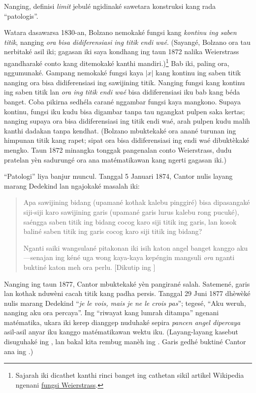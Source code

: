 \documentclass[../../../include/open-logic-section]{subfiles}
\begin{document}

Nanging, definisi \emph{limit} jebulé ngidinaké
sawetara konstruksi kang rada ``patologis''.

Watara dasawarsa 1830-an, Bolzano nemokaké
fungsi kang \emph{kontinu ing saben titik},
nanging \emph{ora bisa didiferensiasi ing titik endi waé}.
(Sayangé, Bolzano ora tau nerbitaké asil iki;
gagasan iki saya kondhang ing taun
1872 nalika Weierstrass ngandharaké
conto kang ditemokaké kanthi mandiri.)\footnote{Sajarah
iki dicathet kanthi rinci banget ing cathetan
sikil artikel Wikipedia ngenani
\href{http://en.wikipedia.org/wiki/Weierstrass_function}{fungsi
Weierstrass}.} Bab iki, paling ora, nggumunaké.
Gampang nemokaké fungsi kaya $|x|$ kang
kontinu ing saben titik nanging ora bisa
didiferensiasi ing sawijining titik.
Nanging fungsi kang kontinu ing saben
titik lan \emph{ora ing titik endi waé}
bisa didiferensiasi iku bab kang béda
banget. Coba pikirna sedhéla carané
nggambar fungsi kaya mangkono. Supaya
kontinu, fungsi iku kudu bisa digambar
tanpa tau ngangkat pulpen saka kertas;
nanging supaya ora bisa didiferensiasi
ing titik endi waé, arah pulpen kudu
malih kanthi dadakan tanpa kendhat.
(Bolzano mbuktekaké ora anané turunan ing himpunan titik kang rapet; sipat ora bisa didiferensiasi ing endi waé dibuktèkaké mengko. Taun 1872 minangka tonggak pangenalan conto Weierstrass, dudu pratelan yèn sadurungé ora ana matématikawan kang ngerti gagasan iki.)

``Patologi'' liya banjur muncul. Tanggal
5 Januari 1874, Cantor nulis layang
marang Dedekind lan ngajokaké masalah iki:
\begin{quote}
Apa sawijining bidang (upamané kothak
kalebu pinggiré) bisa dipasangaké
siji-siji karo sawijining garis
(upamané garis lurus kalebu
rong pucuké), saéngga saben titik
ing bidang cocog karo siji titik
ing garis, lan kosok baliné saben
titik ing garis cocog karo siji
titik ing bidang?

Nganti saiki wangsulané pitakonan
iki isih katon angel banget
kanggo aku---senajan ing kéné
uga wong kaya-kaya kepéngin
mangsuli \emph{ora} nganti
buktiné katon meh ora perlu.
[Dikutip ing \citealt{Gouvea2011}]
\end{quote}
Nanging ing taun 1877, Cantor mbuktekaké
yèn pangirané salah. Satemené, garis
lan kothak nduwèni cacah titik kang
padha persis. Tanggal 29 Juni 1877
dhèwèké nulis marang Dedekind
``\emph{je le vois, mais je ne le crois pas}'';
tegesé, ``Aku weruh, nanging aku
ora percaya''. Ing ``riwayat kang
lumrah ditampa'' ngenani matématika,
ukara iki kerep dianggep nuduhaké
sepira \emph{pancen angel dipercaya}
asil-asil anyar iku kanggo
matématikawan wektu iku.
(Layang-layang kasebut disuguhaké
ing \citet{Gouvea2011}, lan bakal
kita rembug manèh ing
.
Garis gedhé buktiné Cantor ana
ing .)
\end{document}
